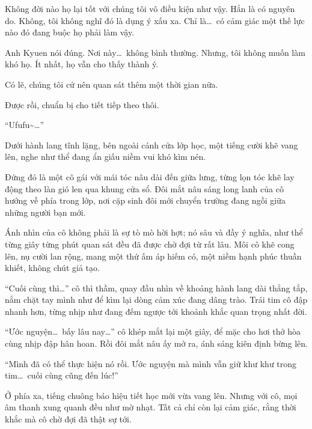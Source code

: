 \documentclass[../main.tex]{subfiles}
\begin{document}
Không đời nào họ lại tốt với chúng tôi vô điều kiện như vậy. Hẳn là có nguyên do. Không, tôi không nghĩ đó là dụng ý xấu xa. Chỉ là\dots\ có cảm giác một thế lực nào đó đang buộc họ phải làm vậy.

Anh Kyuen nói đúng. Nơi này\dots\ không bình thường. Nhưng, tôi không muốn làm khó họ. Ít nhất, họ vẫn cho thấy thành ý.

Có lẽ, chúng tôi cứ nên quan sát thêm một thời gian nữa.

Được rồi, chuẩn bị cho tiết tiếp theo thôi.

\pov{-}

``Ufufu\~{}\dots''

Dưới hành lang tĩnh lặng, bên ngoài cánh cửa lớp học, một tiếng cười khẽ vang lên, nghe như thể đang ẩn giấu niềm vui khó kìm nén.

Đứng đó là một cô gái với mái tóc nâu dài đến giữa lưng, từng lọn tóc khẽ lay động theo làn gió len qua khung cửa sổ. Đôi mắt nâu sáng long lanh của cô hướng về phía trong lớp, nơi cặp sinh đôi mới chuyển trường đang ngồi giữa những người bạn mới.

Ánh nhìn của cô không phải là sự tò mò hời hợt; nó sâu và đầy ý nghĩa, như thể từng giây từng phút quan sát đều đã được chờ đợi từ rất lâu. Môi cô khẽ cong lên, nụ cười lan rộng, mang một thứ ấm áp hiếm có, một niềm hạnh phúc thuần khiết, không chút giả tạo.

``Cuối cùng thì\dots'' cô thì thầm, quay đầu nhìn về khoảng hành lang dài thẳng tắp, nắm chặt tay mình như để kìm lại dòng cảm xúc đang dâng trào. Trái tim cô đập nhanh hơn, từng nhịp như đang đếm ngược tới khoảnh khắc quan trọng nhất đời.

``Ước nguyện\dots\ bấy lâu nay\dots'' cô khép mắt lại một giây, để mặc cho hơi thở hòa cùng nhịp đập hân hoan. Rồi đôi mắt nâu ấy mở ra, ánh sáng kiên định bừng lên.

``Mình đã có thể thực hiện nó rồi. Ước nguyện mà mình vẫn giữ khư khư trong tim\dots\ cuối cùng cũng đến lúc!''

Ở phía xa, tiếng chuông báo hiệu tiết học mới vừa vang lên. Nhưng với cô, mọi âm thanh xung quanh đều như mờ nhạt. Tất cả chỉ còn lại cảm giác, rằng thời khắc mà cô chờ đợi đã thật sự tới.
\end{document}
